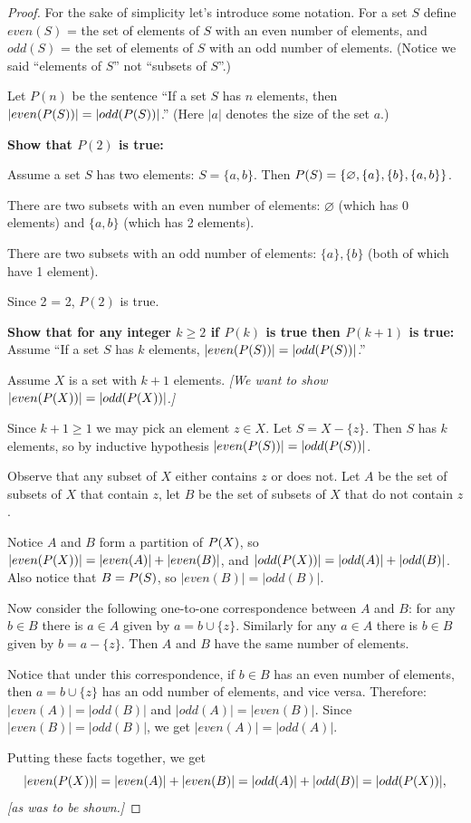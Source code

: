 \documentclass[14pt]{extarticle}
\let\mathscr\relax
\newcommand{\ps}{\mathscr{P}}
\newcommand{\es}{\varnothing}
\begin{document}
\begin{proof}
For the sake of simplicity let's introduce some notation. For a set $S$ define \(even(S)\) = the set of elements of
$S$ with an even number of elements, and \(odd(S)\) = the set of elements of $S$ with an odd number of elements.
(Notice we said ``elements of $S$'' not ``subsets of $S$''.)

Let $P(n)$ be the sentence “If a set $S$ has $n$ elements, then \(|even(\ps(S))| = |odd(\ps(S))|\).” (Here $|a|$ denotes the size of the set $a$.)

{\bf Show that $P(2)$ is true:}

Assume a set $S$ has two elements: \(S = \{a, b\}\). Then \(\ps(S) = \{\es, \{a\}, \{b\}, \{a, b\}\}\). 

There are two subsets with an even number of elements: \(\es\) (which has 0 elements) and \(\{a, b\}\) (which has 2
elements).

There are two subsets with an odd number of elements: \(\{a\}, \{b\}\) (both of which have 1 element).

Since 2 = 2, $P(2)$ is true.

{\bf Show that for any integer $k \geq 2$ if $P(k)$ is true then $P(k+1)$ is true:} Assume “If a set $S$ has $k$ elements, \(|even(\ps(S))| = |odd(\ps(S))|\).”

Assume $X$ is a set with $k+1$ elements. {\it [We want to show \(|even(\ps(X))| = |odd(\ps(X))|\).]} 

Since $k+1 \geq 1$ we may pick an element $z \in X$. Let $S = X - \{z\}$. Then $S$ has $k$ elements, so by inductive hypothesis \(|even(\ps(S))| = |odd(\ps(S))|\).

Observe that any subset of $X$ either contains $z$ or does not. Let $A$ be the set of subsets of $X$ that contain $z$, 
let $B$ be the set of subsets of $X$ that do not contain $z$. 

Notice $A$ and $B$ form a partition of $\ps(X)$, so \(|even(\ps(X))| = |even(A)| + |even(B)|\), and \(|
odd(\ps(X))| = |odd(A)| + |odd(B)|\). Also notice that \(B = \ps(S)\), so \(|even(B)| = |odd(B)|\).

Now consider the following one-to-one correspondence between $A$ and $B$: for any $b \in B$ there is $a \in A$
given by \(a = b \cup \{z\}\). Similarly for any $a \in A$ there is $b \in B$ given by \(b = a - \{z\}\). Then $A$ and
$B$ have the same number of elements.

Notice that under this correspondence, if $b \in B$ has an even number of elements, then \(a = b \cup \{z\}\) has an
odd number of elements, and vice versa. Therefore: \(|even(A)| = |odd(B)|\) and \(|odd(A)| = |even(B)|\). Since
\(|even(B)| = |odd(B)|\), we get \(|even(A)| = |odd(A)|\).

Putting these facts together, we get
\[
|even(\ps(X))| = |even(A)| + |even(B)| = |odd(A)| + |odd(B)| = |odd(\ps(X))|,
\]
{\it [as was to be shown.]}
\end{proof}
\end{document}
